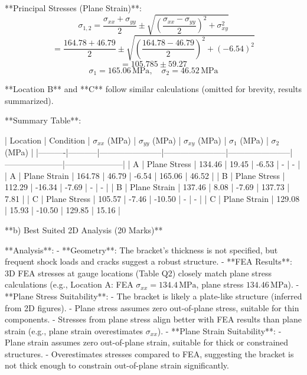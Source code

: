 **Principal Stresses (Plane Strain)**:
\[
\sigma_{1,2} = \frac{\sigma_{xx} + \sigma_{yy}}{2} \pm \sqrt{\left( \frac{\sigma_{xx} - \sigma_{yy}}{2} \right)^2 + \sigma_{xy}^2}
\]
\[
= \frac{164.78 + 46.79}{2} \pm \sqrt{\left( \frac{164.78 - 46.79}{2} \right)^2 + (-6.54)^2}
\]
\[
= 105.785 \pm 59.27
\]
\[
\sigma_1 = 165.06 \, \text{MPa}, \quad \sigma_2 = 46.52 \, \text{MPa}
\]

**Location B** and **C** follow similar calculations (omitted for brevity, results summarized).

**Summary Table**:

| Location | Condition | \(\sigma_{xx}\) (MPa) | \(\sigma_{yy}\) (MPa) | \(\sigma_{xy}\) (MPa) | \(\sigma_1\) (MPa) | \(\sigma_2\) (MPa) |
|----------|-----------|-----------------------|-----------------------|-----------------------|---------------------|---------------------|
| A        | Plane Stress | 134.46                | 19.45                 | -6.53                 | -                   | -                   |
| A        | Plane Strain | 164.78                | 46.79                 | -6.54                 | 165.06              | 46.52               |
| B        | Plane Stress | 112.29                | -16.34                | -7.69                 | -                   | -                   |
| B        | Plane Strain | 137.46                | 8.08                  | -7.69                 | 137.73              | 7.81                |
| C        | Plane Stress | 105.57                | -7.46                 | -10.50                | -                   | -                   |
| C        | Plane Strain | 129.08                | 15.93                 | -10.50                | 129.85              | 15.16               |

**b) Best Suited 2D Analysis (20 Marks)**

**Analysis**:
- **Geometry**: The bracket’s thickness is not specified, but frequent shock loads and cracks suggest a robust structure.
- **FEA Results**: 3D FEA stresses at gauge locations (Table Q2) closely match plane stress calculations (e.g., Location A: FEA \( \sigma_{xx} = 134.4 \, \text{MPa} \), plane stress \( 134.46 \, \text{MPa} \)).
- **Plane Stress Suitability**:
  - The bracket is likely a plate-like structure (inferred from 2D figures).
  - Plane stress assumes zero out-of-plane stress, suitable for thin components.
  - Stresses from plane stress align better with FEA results than plane strain (e.g., plane strain overestimates \( \sigma_{xx} \)).
- **Plane Strain Suitability**:
  - Plane strain assumes zero out-of-plane strain, suitable for thick or constrained structures.
  - Overestimates stresses compared to FEA, suggesting the bracket is not thick enough to constrain out-of-plane strain significantly.

